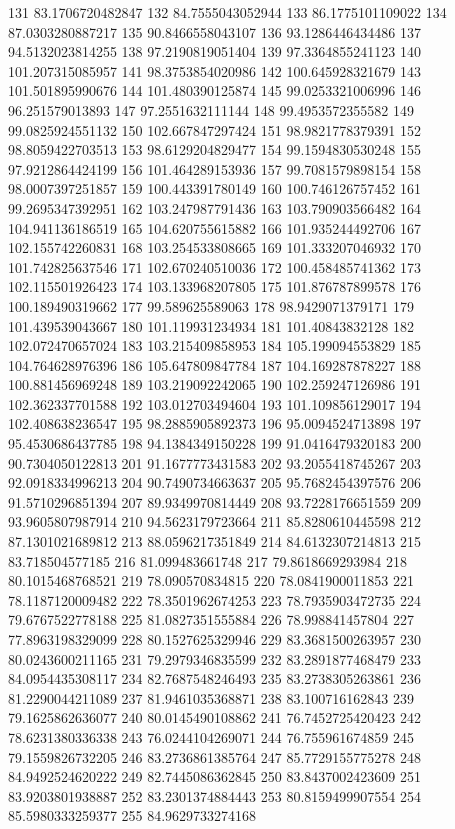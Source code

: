 {131 83.1706720482847
132 84.7555043052944
133 86.1775101109022
134 87.0303280887217
135 90.8466558043107
136 93.1286446434486
137 94.5132023814255
138 97.2190819051404
139 97.3364855241123
140 101.207315085957
141 98.3753854020986
142 100.645928321679
143 101.501895990676
144 101.480390125874
145 99.0253321006996
146 96.251579013893
147 97.2551632111144
148 99.4953572355582
149 99.0825924551132
150 102.667847297424
151 98.9821778379391
152 98.8059422703513
153 98.6129204829477
154 99.1594830530248
155 97.9212864424199
156 101.464289153936
157 99.7081579898154
158 98.0007397251857
159 100.443391780149
160 100.746126757452
161 99.2695347392951
162 103.247987791436
163 103.790903566482
164 104.941136186519
165 104.620755615882
166 101.935244492706
167 102.155742260831
168 103.254533808665
169 101.333207046932
170 101.742825637546
171 102.670240510036
172 100.458485741362
173 102.115501926423
174 103.133968207805
175 101.876787899578
176 100.189490319662
177 99.589625589063
178 98.9429071379171
179 101.439539043667
180 101.119931234934
181 101.40843832128
182 102.072470657024
183 103.215409858953
184 105.199094553829
185 104.764628976396
186 105.647809847784
187 104.169287878227
188 100.881456969248
189 103.219092242065
190 102.259247126986
191 102.362337701588
192 103.012703494604
193 101.109856129017
194 102.408638236547
195 98.2885905892373
196 95.0094524713898
197 95.4530686437785
198 94.1384349150228
199 91.0416479320183
200 90.7304050122813
201 91.1677773431583
202 93.2055418745267
203 92.0918334996213
204 90.7490734663637
205 95.7682454397576
206 91.5710296851394
207 89.9349970814449
208 93.7228176651559
209 93.9605807987914
210 94.5623179723664
211 85.8280610445598
212 87.1301021689812
213 88.0596217351849
214 84.6132307214813
215 83.718504577185
216 81.099483661748
217 79.8618669293984
218 80.1015468768521
219 78.090570834815
220 78.0841900011853
221 78.1187120009482
222 78.3501962674253
223 78.7935903472735
224 79.6767522778188
225 81.0827351555884
226 78.998841457804
227 77.8963198329099
228 80.1527625329946
229 83.3681500263957
230 80.0243600211165
231 79.2979346835599
232 83.2891877468479
233 84.0954435308117
234 82.7687548246493
235 83.2738305263861
236 81.2290044211089
237 81.9461035368871
238 83.100716162843
239 79.1625862636077
240 80.0145490108862
241 76.7452725420423
242 78.6231380336338
243 76.0244104269071
244 76.755961674859
245 79.1559826732205
246 83.2736861385764
247 85.7729155775278
248 84.9492524620222
249 82.7445086362845
250 83.8437002423609
251 83.9203801938887
252 83.2301374884443
253 80.8159499907554
254 85.5980333259377
255 84.9629733274168
}
